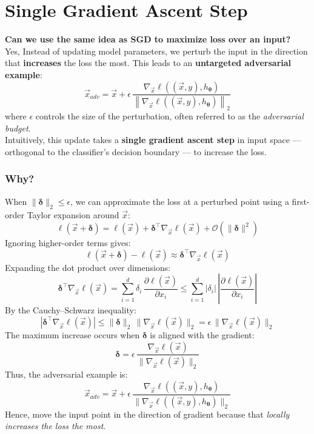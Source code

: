 \documentclass[11pt]{report}
\begin{document}
\section{Single Gradient Ascent Step}
\textbf{Can we use the same idea as SGD to maximize loss over an input?}\\
Yes, Instead of updating model parameters, we perturb the input in the direction that 
\textbf{increases} the loss the most.  
This leads to an \textbf{untargeted adversarial example}:
\[
\vec{x}_{adv} = \vec{x} + \epsilon 
\, \frac{\nabla_{\vec{x}} \ell((\vec{x}, y), h_{\boldsymbol{\theta}})}
{\left\| \nabla_{\vec{x}} \ell((\vec{x}, y), h_{\boldsymbol{\theta}}) \right\|_2}
\]
where $\epsilon$ controls the size of the perturbation, often referred to as the 
\emph{adversarial budget}. \\
Intuitively, this update takes a \textbf{single gradient ascent step} in input space — 
orthogonal to the classifier’s decision boundary — to increase the loss.

\subsubsection*{Why?}

When $\|\boldsymbol{\delta}\|_2 \leq \epsilon$, we can approximate the loss at a perturbed point 
using a first-order Taylor expansion around $\vec{x}$:
\[
\ell(\vec{x} + \boldsymbol{\delta}) 
= \ell(\vec{x}) + \boldsymbol{\delta}^{\top} \nabla_{\vec{x}} \ell(\vec{x}) 
+ \mathcal{O}(\|\boldsymbol{\delta}\|^2)
\]
Ignoring higher-order terms gives:
\[
\ell(\vec{x} + \boldsymbol{\delta}) - \ell(\vec{x}) 
\approx \boldsymbol{\delta}^{\top} \nabla_{\vec{x}} \ell(\vec{x})
\]
Expanding the dot product over dimensions:
\[
\boldsymbol{\delta}^{\top} \nabla_{\vec{x}} \ell(\vec{x}) 
= \sum_{i=1}^{d} \delta_i \, 
\frac{\partial \ell(\vec{x})}{\partial x_i}
\leq \sum_{i=1}^{d} 
|\delta_i| \, 
\left| \frac{\partial \ell(\vec{x})}{\partial x_i} \right|
\]
By the Cauchy–Schwarz inequality:
\[
|\boldsymbol{\delta}^{\top} \nabla_{\vec{x}} \ell(\vec{x})|
\leq \|\boldsymbol{\delta}\|_2 \, 
\|\nabla_{\vec{x}} \ell(\vec{x})\|_2 = \epsilon \, 
\|\nabla_{\vec{x}} \ell(\vec{x})\|_2
\]
The maximum increase occurs when $\boldsymbol{\delta}$ is aligned with the gradient:
\[
\boldsymbol{\delta} = 
\epsilon \, 
\frac{\nabla_{\vec{x}} \ell(\vec{x})}
{\|\nabla_{\vec{x}} \ell(\vec{x})\|_2}
\]
Thus, the adversarial example is:
\[
\vec{x}_{adv} = \vec{x} + \epsilon \, 
\frac{\nabla_{\vec{x}} \ell((\vec{x}, y), h_{\boldsymbol{\theta}})}
{\|\nabla_{\vec{x}} \ell((\vec{x}, y), h_{\boldsymbol{\theta}})\|_2}
\]
Hence, move the input point in the direction of gradient because that \emph{locally increases the loss the most}.
\end{document}
